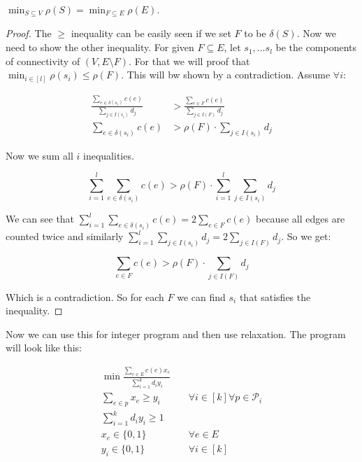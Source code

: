 \begin{lemma}
	$\min_{S \subseteq V} \rho(S) = \min_{F \subseteq E} \rho(E)$.
\end{lemma}

\begin{proof}
	The $\geq$ inequality can be easily seen if we set $F$ to be $\delta(S)$. Now we need to show the other inequality. For given $F \subseteq E$, let $s_{1}, \dots s_{l}$ be the components of connectivity of $(V, E \setminus F)$. For that we will proof that $\min_{i \in [l]} \rho(s_{i}) \leq \rho(F)$. This will bw shown by a contradiction. Assume $\forall i$:
	
	$$
	\begin{aligned}
		\frac{\sum_{e \in \delta(s_{i})}c(e)}{\sum_{j \in I(s_{i})} d_{j}} &> \frac{\sum_{e \in F}c(e)}{\sum_{j \in I(F)} d_{j}}\\
		\sum_{e \in \delta(s_{i})}c(e) &> \rho(F) \cdot \sum_{j \in I(s_{i})} d_{j}
	\end{aligned}
	$$
	
	Now we sum all $i$ inequalities.
	
	$$
	\sum_{i = 1}^{l} \sum_{e \in \delta(s_{i})}c(e) > \rho(F) \cdot \sum_{i = 1}^{l} \sum_{j \in I(s_{i})} d_{j}
	$$

	We can see that $\sum_{i = 1}^{l} \sum_{e \in \delta(s_{i})}c(e) = 2 \sum_{e \in F} c(e)$ because all edges are counted twice and similarly $\sum_{i = 1}^{l} \sum_{j \in I(s_{i})} d_{j} = 2 \sum_{j \in I(F)} d_{j}$. So we get:
	
	$$
	\sum_{e \in F} c(e) > \rho(F) \cdot \sum_{j \in I(F)} d_{j}
	$$
	
	Which is a contradiction. So for each $F$ we can find $s_{i}$ that satisfies the inequality.
\end{proof}

Now we can use this for integer program and then use relaxation. The program will look like this:

$$
\begin{aligned}
	\min \frac{\sum_{e \in E} c(e) x_{e}}{\sum_{i = 1}^{k}d_{i}y_{i}} \\
	\sum_{e \in p} x_{e} \geq y_{i} & \quad \forall i \in [k] \forall p \in \mathcal{P}_{i}\\
	\sum_{i = 1}^{k} d_{i}y_{i} \geq 1 \\
	x_{e} \in \{0,1\} &\quad \forall e \in E\\
	y_{i} \in \{0,1\} &\quad \forall i \in [k]
\end{aligned}
$$

